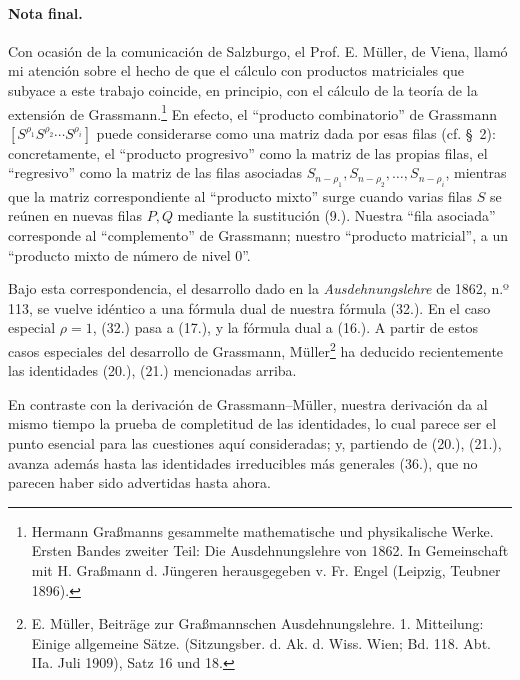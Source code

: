\documentclass[11pt]{article}
\begin{document}
\paragraph{Nota final.} Con ocasión de la comunicación de Salzburgo, el Prof. E. Müller, de Viena, llamó mi atención sobre el hecho de que el cálculo con productos matriciales que subyace a este trabajo coincide, en principio, con el cálculo de la teoría de la extensión de Grassmann.\footnote{Hermann Graßmanns gesammelte mathematische und physikalische Werke. Ersten Bandes zweiter Teil: Die Ausdehnungslehre von 1862. In Gemeinschaft mit H. Graßmann d. Jüngeren herausgegeben v. Fr. Engel (Leipzig, Teubner 1896).} En efecto, el ``producto combinatorio'' de Grassmann $[S^{\rho_1}S^{\rho_2}\cdots S^{\rho_i}]$ puede considerarse como una matriz dada por esas filas (cf. \S\ 2): concretamente, el ``producto progresivo'' como la matriz de las propias filas, el ``regresivo'' como la matriz de las filas asociadas $S_{n-\rho_1},S_{n-\rho_2},\ldots,S_{n-\rho_i}$, mientras que la matriz correspondiente al ``producto mixto'' surge cuando varias filas $S$ se reúnen en nuevas filas $P,Q$ mediante la sustitución (9.). Nuestra ``fila asociada'' corresponde al ``complemento'' de Grassmann; nuestro ``producto matricial'', a un ``producto mixto de número de nivel 0''.

Bajo esta correspondencia, el desarrollo dado en la \emph{Ausdehnungslehre} de 1862, n.º 113, se vuelve idéntico a una fórmula dual de nuestra fórmula (32.). En el caso especial $\rho=1$, (32.) pasa a (17.), y la fórmula dual a (16.). A partir de estos casos especiales del desarrollo de Grassmann, Müller\footnote{E. Müller, Beiträge zur Graßmannschen Ausdehnungslehre. 1. Mitteilung: Einige allgemeine Sätze. (Sitzungsber. d. Ak. d. Wiss. Wien; Bd. 118. Abt. IIa. Juli 1909), Satz 16 und 18.} ha deducido recientemente las identidades (20.), (21.) mencionadas arriba.

En contraste con la derivación de Grassmann--Müller, nuestra derivación da al mismo tiempo la prueba de completitud de las identidades, lo cual parece ser el punto esencial para las cuestiones aquí consideradas; y, partiendo de (20.), (21.), avanza además hasta las identidades irreducibles más generales (36.), que no parecen haber sido advertidas hasta ahora.
\end{document}
